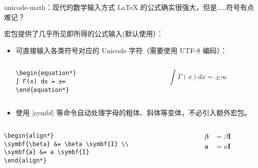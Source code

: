 \begin{frame}[fragile,label={frame:unicode-math}]{unicode-math：现代的数学输入方式}
  \LaTeX{} 的公式确实很强大，但是……符号有点难记？

   宏包提供了几乎所见即所得的公式输入(\SJTUThesis 默认使用）：

  \begin{itemize}
    \item 可直接输入各类符号对应的 Unicode 字符（需要使用 UTF-8 编码）：

          \begin{columns}[c]
            \begin{column}{0.45\textwidth}
              \begin{lstlisting}[basicstyle=\ttfamily]
\begin{equation*}
∫ Γ(x) dx = ±∞
\end{equation*}
      \end{lstlisting}
            \end{column}\hspace{1em}
            \begin{column}{0.45\textwidth}
              \begin{equation*}
                ∫ Γ(x) dx = ±∞
              \end{equation*}
            \end{column}
          \end{columns}
    \item 使用 |symbf| 等命令自动处理字母的粗体、斜体等变体，不必引入额外宏包。
  \end{itemize}

  \begin{columns}[c]
    \begin{column}{0.45\textwidth}
      \begin{lstlisting}[basicstyle=\ttfamily]
\begin{align*}
\symbf{\beta} &= \beta \symbf{I} \\
\symbf{a} &= a \symbf{I}
\end{align*}
\end{lstlisting}
    \end{column}\hspace{1em}
    \begin{column}{0.45\textwidth}
      \begin{align*}
        \symbf{\beta} & = \beta \symbf{I} \\
        \symbf{a}     & = a \symbf{I}
      \end{align*}
    \end{column}
  \end{columns}

\end{frame}

